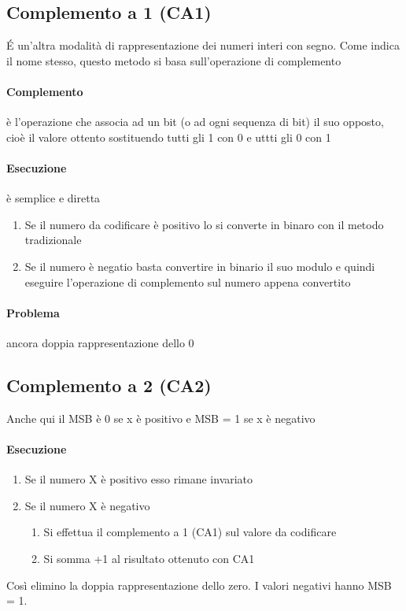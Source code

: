 \documentclass[12pt, a4paper, openany]{book}
\begin{document}
\subsection{Complemento a 1 (CA1)}
\'E un'altra modalità di rappresentazione dei numeri interi con segno. Come indica il nome stesso, questo metodo si basa sull'operazione di complemento

\paragraph{Complemento} è l'operazione che associa ad un bit (o ad ogni sequenza di bit) il suo opposto, cioè il valore ottento
sostituendo tutti gli 1 con 0 e uttti gli 0 con 1
\paragraph{Esecuzione} è semplice e diretta
\begin{enumerate}
    \item Se il numero da codificare è positivo lo si converte in binaro con il metodo tradizionale
    \item Se il numero è negatio basta convertire in binario il suo modulo e quindi eseguire l'operazione di complemento sul numero appena convertito
\end{enumerate} 
\paragraph{Problema} ancora doppia rappresentazione dello 0

\subsection{Complemento a 2 (CA2)}
Anche qui il MSB è 0 se x è positivo e MSB = 1 se x è negativo
\paragraph{Esecuzione}
\begin{enumerate}
    \item Se il numero X è positivo esso rimane invariato
    \item Se il numero X è negativo
    \begin{enumerate}
        \item Si effettua il complemento a 1 (CA1) sul valore da codificare
        \item Si somma +1 al risultato ottenuto con CA1
    \end{enumerate}
\end{enumerate}
Così elimino la doppia rappresentazione dello zero. I valori negativi hanno MSB = 1.
\end{document}
